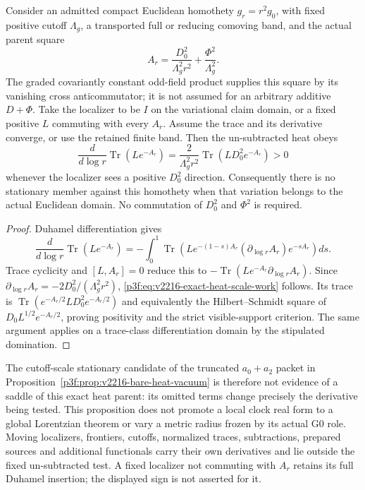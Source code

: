 \documentclass[11pt,a4paper]{article}
\begin{document}
\begin{proposition}
\label{p3f:prop:v2216-exact-heat-scale-work}
Consider an admitted compact Euclidean homothety $g_r=r^2g_0$, with
fixed positive cutoff $\Lambda_g$, a transported full or reducing
comoving band, and the actual parent square
\[
 A_r=\frac{D_0^2}{\Lambda_g^2r^2}+\frac{\Phi^2}{\Lambda_g^2}.
\]
The graded covariantly constant odd-field product supplies this square
by its vanishing cross anticommutator; it is not assumed for an arbitrary
additive $D+\Phi$.  Take the localizer to be $I$ on the variational
claim domain, or a fixed positive $L$ commuting with every $A_r$.
Assume the trace and its derivative converge, or use the retained finite
band.  Then the un-subtracted heat obeys
\begin{equation}
 \frac{d}{d\log r}\operatorname{Tr}(Le^{-A_r})
 =\frac{2}{\Lambda_g^2r^2}\operatorname{Tr}(LD_0^2e^{-A_r})>0
 \label{p3f:eq:v2216-exact-heat-scale-work}
\end{equation}
whenever the localizer sees a positive $D_0^2$ direction.  Consequently
there is no stationary member against this homothety when that
variation belongs to the actual Euclidean domain.  No commutation of
$D_0^2$ and $\Phi^2$ is required.
\end{proposition}
\begin{proof}
Duhamel differentiation gives
\[
 \frac{d}{d\log r}\operatorname{Tr}(Le^{-A_r})
 =-\int_0^1\operatorname{Tr}
 (Le^{-(1-s)A_r}(\partial_{\log r}A_r)e^{-sA_r})ds.
\]
Trace cyclicity and $[L,A_r]=0$ reduce this to
$-\operatorname{Tr}(Le^{-A_r}\partial_{\log r}A_r)$.
Since $\partial_{\log r}A_r=-2D_0^2/(\Lambda_g^2r^2)$,
\eqref{p3f:eq:v2216-exact-heat-scale-work} follows.  Its trace is
$\operatorname{Tr}(e^{-A_r/2}LD_0^2e^{-A_r/2})$ and equivalently the
Hilbert--Schmidt square of $D_0L^{1/2}e^{-A_r/2}$, proving positivity
and the strict visible-support criterion.  The same argument applies
on a trace-class differentiation domain by the stipulated domination.
\end{proof}
The cutoff-scale stationary candidate of the truncated $a_0+a_2$
packet in Proposition~\ref{p3f:prop:v2216-bare-heat-vacuum} is therefore
not evidence of a saddle of this exact heat parent: its omitted terms
change precisely the derivative being tested.  This proposition does
not promote a local clock real form to a global Lorentzian theorem or
vary a metric radius frozen by its actual G0 role.  Moving localizers,
frontiers, cutoffs, normalized traces, subtractions, prepared sources
and additional functionals carry their own derivatives and lie outside
the fixed un-subtracted test.  A fixed localizer not commuting with
$A_r$ retains its full Duhamel insertion; the displayed sign is not
asserted for it.
\end{document}
